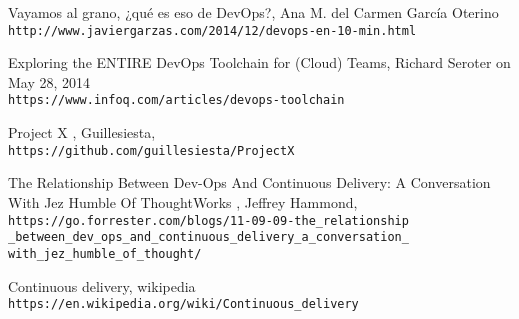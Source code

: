 \begin{thebibliography}{999}
 Vayamos al grano, ¿qué es eso de DevOps?,  Ana M. del Carmen García Oterino
\\\texttt{http://www.javiergarzas.com/2014/12/devops-en-10-min.html}

 Exploring the ENTIRE DevOps Toolchain for (Cloud) Teams,  Richard Seroter on May 28, 2014
\\\texttt{https://www.infoq.com/articles/devops-toolchain}

Project X , Guillesiesta,
\\\texttt{https://github.com/guillesiesta/ProjectX}

The Relationship Between Dev-Ops And Continuous Delivery: A Conversation With Jez Humble Of ThoughtWorks , Jeffrey Hammond,
\\\texttt{https://go.forrester.com/blogs/11-09-09-the\_relationship
\_between\_dev\_ops\_and\_continuous\_delivery\_a\_conversation\_
with\_jez\_humble\_of\_thought/}

Continuous delivery, wikipedia
\\\texttt{https://en.wikipedia.org/wiki/Continuous\_delivery}

\end{thebibliography}

